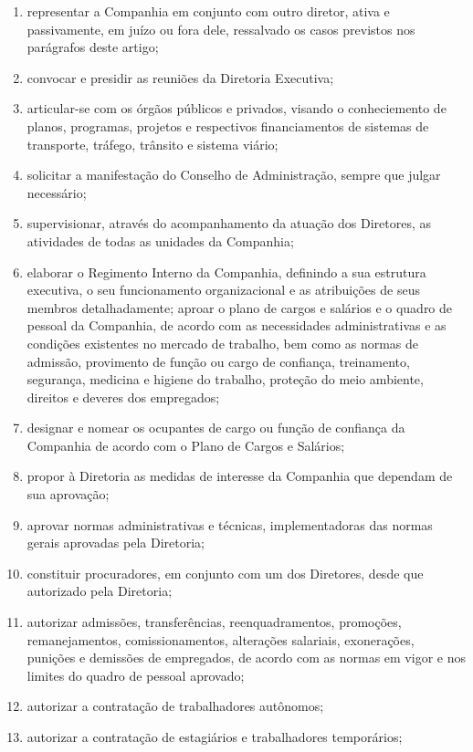 \documentclass[a4paper,11pt]{report}
\begin{document}
\begin{enumerate}[resume, label=Art. \arabic*]
        \begin{enumerate}[label=\roman*.]
        \item representar a Companhia em conjunto com outro diretor, ativa e passivamente, em juízo ou fora dele, ressalvado os casos previstos nos parágrafos deste artigo;
        \item convocar e presidir as reuniões da Diretoria Executiva;
        \item articular-se com os órgãos públicos e privados, visando o conheciemento de planos, programas, projetos e respectivos financiamentos de sistemas de transporte, tráfego, trânsito e sistema viário;
        \item solicitar a manifestação do Conselho de Administração, sempre que julgar necessário;
        \item supervisionar, através do acompanhamento da atuação dos Diretores, as atividades de todas as unidades da Companhia;
        \item elaborar o Regimento Interno da Companhia, definindo a sua estrutura executiva, o seu funcionamento organizacional e as atribuições de seus membros detalhadamente;
        aproar o plano de cargos e salários e o quadro de pessoal da Companhia, de acordo com as necessidades administrativas e as condições existentes no mercado de trabalho, bem como as normas de admissão, provimento de função ou cargo de confiança, treinamento, segurança, medicina e higiene do trabalho, proteção do meio ambiente, direitos e deveres dos empregados;
        \item designar e nomear os ocupantes de cargo ou função de confiança da Companhia de acordo com o Plano de Cargos e Salários;
        \item propor à Diretoria as medidas de interesse da Companhia que dependam de sua aprovação;
        \item aprovar normas administrativas e técnicas, implementadoras das normas gerais aprovadas pela Diretoria;
        \item constituir procuradores, em conjunto com um dos Diretores, desde que autorizado pela Diretoria;
        \item autorizar admissões, transferências, reenquadramentos, promoções, remanejamentos, comissionamentos, alterações salariais, exonerações, punições e demissões de empregados, de acordo com as normas em vigor e nos limites do quadro de pessoal aprovado;
        \item autorizar a contratação de trabalhadores autônomos;
        \item autorizar a contratação de estagiários e trabalhadores temporários;

\end{enumerate}
\end{enumerate}
\end{document}
